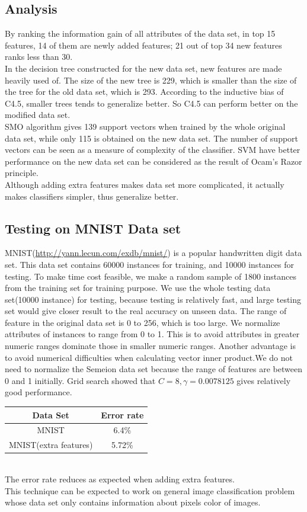 \documentclass[a4paper,11pt]{article}
\begin{document}
\subsection{Analysis}
By ranking the information gain of all attributes of the data set, in top 15 features, 14 of them are newly added features; 21 out of top 34 new features ranks less than 30. \\
In the decision tree constructed for the new data set, new features are made heavily used of. The size of the new tree is 229, which is smaller than the size of the tree for the old data set, which is 293. According to the inductive bias of C4.5, smaller trees tends to generalize better. So C4.5 can perform better on the modified data set.\\
SMO algorithm gives 139 support vectors when trained by the whole original data set, while only 115 is obtained on the new data set. The number of support vectors can be seen as a measure of complexity of the classifier. SVM have better performance on the new data set can be considered as the result of Ocam's Razor principle.\\
Although adding extra features makes data set more complicated, it actually makes classifiers simpler, thus generalize better.
\subsection{Testing on MNIST Data set}
MNIST(\url{http://yann.lecun.com/exdb/mnist/}) is a popular handwritten digit data set. This data set contains 60000 instances for training, and 10000 instances for testing. To make time cost feasible, we make a random sample of 1800 instances from the training set for training purpose. We use the whole testing data set(10000 instance) for testing, because testing is relatively fast, and large testing set would give closer result to the real accuracy on unseen data. The range of feature in the original data set is 0 to 256, which is too large. We normalize attributes of instances to range from 0 to 1. This is to avoid attributes in greater numeric ranges dominate those in smaller numeric ranges. Another advantage is to avoid numerical difficulties when calculating vector inner product\cite{SVM}.We do not need to normalize the Semeion data set because the range of features are between 0 and 1 initially. Grid search showed that $C=8, \gamma=0.0078125$ gives relatively good performance.\\
\vspace{0.5cm}
\begin{tabular}{c c}
Data Set	& Error rate\\
\hline \hline
MNIST	                  & 6.4\%\\
MNIST(extra features)	  & 5.72\%\\
\end{tabular}
\vspace{0.5cm}\\
The error rate reduces as expected when adding extra features. \\
This technique can be expected to work on general image classification problem whose data set only contains information about pixels color of images.
\end{document}
